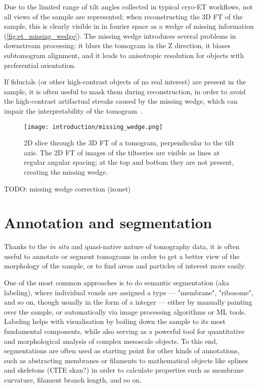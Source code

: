 Due to the limited range of tilt angles collected in typical cryo-ET workflows, not all views of the sample are represented; when reconstructing the 3D FT of the sample, this is clearly visible in in fourier space as a wedge of missing information (\autoref{fig:et_missing_wedge}).
The missing wedge introduces several problems in downstream processing: it blurs the tomogram in the Z direction, it biases subtomogram alignment, and it leads to anisotropic resolution for objects with preferential orientation.

If fiducials (or other high-contrast objects of no real interest) are present in the sample, it is often useful to mask them during reconstruction, in order to avoid the high-contrast artifactual streaks caused by the missing wedge, which can impair the interpretability of the tomogram~\cite{tegunovRealtimeCryoelectronMicroscopy2019,burtTeamtomoFidder2024}.

\begin{figure}[ht]
    \centering
    \texttt{[image: introduction/missing\_wedge.png]}
    \caption[Missing wedge]{2D slice through the 3D FT of a tomogram, perpendicular to the tilt axis. The 2D FT of images of the tiltseries are visible as lines at regular angular spacing; at the top and bottom they are not present, creating the missing wedge.}
    \label{fig:et_missing_wedge}
\end{figure}

TODO: missing wedge correction (isonet)

\section{Annotation and segmentation}\label{et_annotation_segmentation}
Thanks to the \textit{in situ} and quasi-native nature of tomography data, it is often useful to annotate or segment tomograms in order to get a better view of the morphology of the sample, or to find areas and particles of interest more easily.

One of the most common approaches is to do semantic segmentation (aka labeling), where individual voxels are assigned a type --- "membrane", "ribosome", and so on, though usually in the form of a integer --- either by manually painting over the sample, or automatically via image processing algorithms or ML tools.
Labeling helps with visualisation by boiling down the sample to its most fundamental components, while also serving as a powerful tool for quantitative and morphological analysis of complex mesoscale objects.
To this end, segmentations are often used as starting point for other kinds of annotations, such as abstracting membranes or filaments to mathematical objects like splines and skeletons (CITE skan?) in order to calculate properties such as membrane curvature, filament branch length, and so on.

